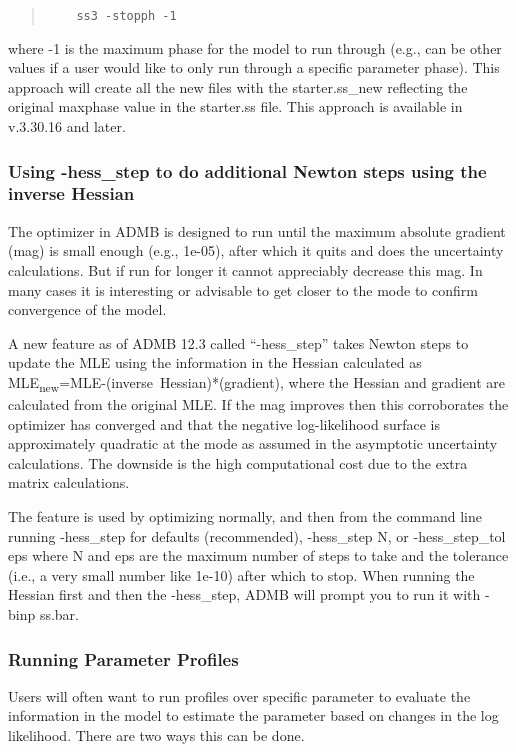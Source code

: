 \begin{quote}
	\begin{verbatim}
	ss3 -stopph -1
	\end{verbatim}
\end{quote}  

where -1 is the maximum phase for the model to run through (e.g., can be other values if a user would like to only run through a specific parameter phase). This approach will create all the new files with the starter.ss\_new reflecting the original maxphase value in the starter.ss file. This approach is available in v.3.30.16 and later.

\hypertarget{hess-step}{}
\subsubsection{Using -hess\_step to do additional Newton steps using the inverse Hessian}

The optimizer in ADMB is designed to run until the maximum absolute gradient (mag) is small enough (e.g., 1e-05), after which it quits and does the uncertainty calculations. But if run for longer it cannot appreciably decrease this mag. In many cases it is interesting or advisable to get closer to the mode to confirm convergence of the model. 

A new feature as of ADMB 12.3 called ``-hess\_step'' takes Newton steps to update the MLE using the information in the Hessian calculated as MLE\textsubscript{new}=MLE-(inverse~Hessian)*(gradient), where the Hessian and gradient are calculated from the original MLE. If the mag improves then this corroborates the optimizer has converged and that the negative log-likelihood surface is approximately quadratic at the mode as assumed in the asymptotic uncertainty calculations. The downside is the high computational cost due to the extra matrix calculations.

The feature is used by optimizing normally, and then from the command line running -hess\_step for defaults (recommended), -hess\_step N, or -hess\_step\_tol eps where N and eps are the maximum number of steps to take and the tolerance (i.e., a very small number like 1e-10) after which to stop. When running the Hessian first and then the -hess\_step, ADMB will prompt you to run it with -binp ss.bar.


\subsubsection{Running Parameter Profiles}
Users will often want to run profiles over specific parameter to evaluate the information in the model to estimate the parameter based on changes in the log likelihood. There are two ways this can be done.

